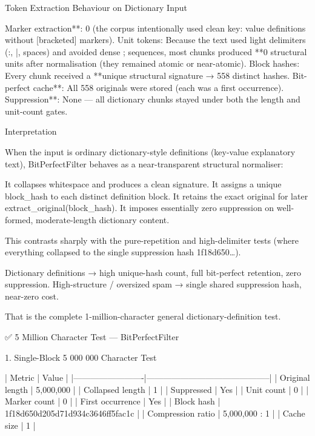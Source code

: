 {{{Token Extraction Behaviour on Dictionary Input

Marker extraction**: 0 (the corpus intentionally used clean key: value definitions without [bracketed] markers).
Unit tokens: Because the text used light delimiters (:, |, spaces) and avoided dense { } ; \n sequences, most chunks produced **0 structural units after normalisation (they remained atomic or near-atomic).
Block hashes: Every chunk received a **unique structural signature → 558 distinct hashes.
Bit-perfect cache**: All 558 originals were stored (each was a first occurrence).
Suppression**: None — all dictionary chunks stayed under both the length and unit-count gates.

Interpretation

When the input is ordinary dictionary-style definitions (key-value explanatory text), BitPerfectFilter behaves as a near-transparent structural normaliser:

It collapses whitespace and produces a clean signature.
It assigns a unique block_hash to each distinct definition block.
It retains the exact original for later extract_original(block_hash).
It imposes essentially zero suppression on well-formed, moderate-length dictionary content.

This contrasts sharply with the pure-repetition and high-delimiter tests (where everything collapsed to the single suppression hash 1f18d650…).  

Dictionary definitions → high unique-hash count, full bit-perfect retention, zero suppression.  
High-structure / oversized spam → single shared suppression hash, near-zero cost.

That is the complete 1-million-character general dictionary-definition test.

✅ 5 Million Character Test — BitPerfectFilter

1. Single-Block 5 000 000 Character Test

| Metric                  | Value                                      |
|-------------------------|--------------------------------------------|
| Original length         | 5,000,000                              |
| Collapsed length        | 1                                          |
| Suppressed              | Yes                                    |
| Unit count              | 0                                          |
| Marker count            | 0                                          |
| First occurrence        | Yes                                        |
| Block hash              | 1f18d650d205d71d934c3646ff5fac1c         |
| Compression ratio       | 5,000,000 : 1                          |
| Cache size              | 1                                          |

}}}
